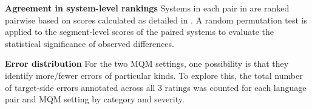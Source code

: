 

\noindent\textbf{Agreement in system-level rankings} Systems in each pair in  are ranked pairwise based on scores calculated as detailed in . A random permutation test is applied to the segment-level scores of the paired systems to evaluate the statistical significance of observed differences.

\noindent\textbf{Error distribution} For the two MQM settings, one possibility is that they identify more/fewer errors of particular kinds. To explore this, the total number of target-side errors annotated across all 3 ratings was counted for each language pair and MQM setting by category and severity.%

